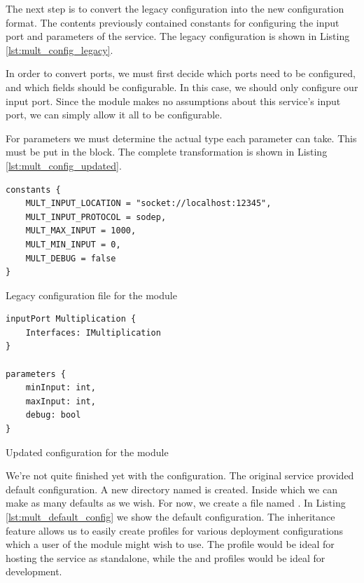 The next step is to convert the legacy configuration into the new configuration
format. The contents  previously contained constants for
configuring the input port and parameters of the service. The legacy
configuration is shown in Listing \ref{lst:mult_config_legacy}.

In order to convert ports, we must first decide which ports need to be
configured, and which fields should be configurable. In this case, we should
only configure our input port. Since the module makes no assumptions about this
service's input port, we can simply allow it all to be configurable.

For parameters we must determine the actual type each parameter can take. This
must be put in the  block. The complete transformation is
shown in Listing \ref{lst:mult_config_updated}.

\begin{listing}[H]

\begin{verbatim}
constants {
    MULT_INPUT_LOCATION = "socket://localhost:12345",
    MULT_INPUT_PROTOCOL = sodep,
    MULT_MAX_INPUT = 1000,
    MULT_MIN_INPUT = 0,
    MULT_DEBUG = false
}
\end{verbatim}

\caption{Legacy configuration file for the  module}

\label{lst:mult_config_legacy}

\end{listing}

\begin{listing}[H]
\begin{verbatim}
inputPort Multiplication {
    Interfaces: IMultiplication
}

parameters {
    minInput: int,
    maxInput: int,
    debug: bool
}
\end{verbatim}
\caption{Updated configuration for the  module}
\label{lst:mult_config_updated}
\end{listing}

We're not quite finished yet with the configuration. The original service
provided default configuration. A new directory named  is created.
Inside which we can make as many defaults as we wish. For now, we create a file
named . In Listing \ref{lst:mult_default_config} we show the
default configuration.  The inheritance feature allows us to easily create
profiles for various deployment configurations which a user of the module might
wish to use. The  profile would be ideal for hosting the
service as standalone, while the  and 
profiles would be ideal for development.

